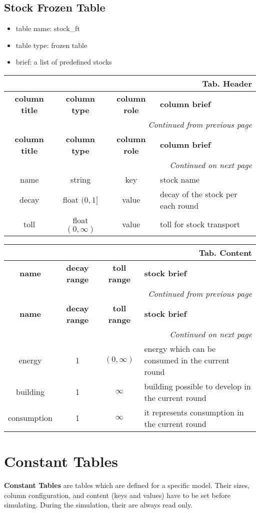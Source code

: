 \documentclass[a4paper,oneside,titlepage]{report}
\newcommand*{\LTHeaderIV}[5]{
  \multicolumn{4}{r}{\textbf{Tab. \thesubsection} \textbf{#1}}\\    
  \hline
  \textbf{#2} & \textbf{#3} & \textbf{#4} & \textbf{#5}\\
  \hline
  
  \endfirsthead
  \multicolumn{4}{r}{\textit{Continued from previous page}}\\    
  \hline
  \textbf{#2} & \textbf{#3} & \textbf{#4} & \textbf{#5}\\
  \hline
  \endhead
  \hline
  \multicolumn{4}{r}{\textit{Continued on next page}}\\
  \endfoot
  \hline
  \endlastfoot  
}
\begin{document}
\subsection{Stock Frozen Table}
\begin{itemize}
  \setlength{\itemsep}{0pt}
  \setlength{\parskip}{0pt}
\item table name: stock\_ft  
\item table type: frozen table   
\item brief: a list of predefined stocks
\end{itemize}
\label{stock_ft}

\vspace{-0.5cm}
\begin{longtable}{ |c|c|c|l| } 
  \LTHeaderIV{Header}{column title}{column type}{column role}{column brief}
  name & string & key & stock name\\
  decay & float $(0, 1]$ & value & decay of the stock per each round\\
  toll & float $(0, \infty)$ & value & toll for stock transport\\
\end{longtable}        

\vspace{-0.5cm}
\begin{longtable}{ |c|c|c|l| }    
  \LTHeaderIV{Content}{name}{decay range}{toll range}{stock brief}                    
  energy & 1 & $(0, \infty)$ & energy which can be consumed in the current round\\
  building & 1 & $\infty$ & building possible to develop in the current round\\
  consumption & 1 & $\infty$  & it represents consumption in the current round\\
\end{longtable}


\section{Constant Tables}
\textbf{Constant Tables} are tables which are defined for a specific model. Their sizes, column configuration, and content (keys and values) have to be set before simulating. During the simulation, their are always read only.

\end{document}
